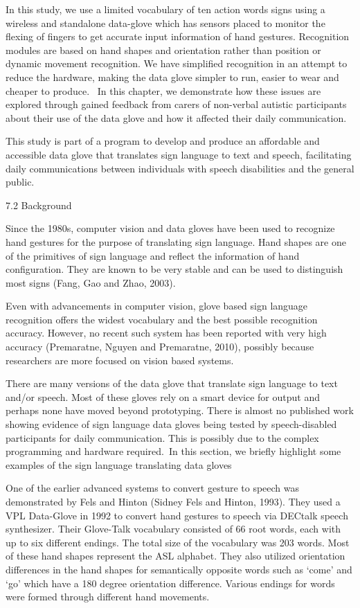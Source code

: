 In this study, we use a limited vocabulary of ten action words signs using a wireless and standalone data-glove which has sensors placed to monitor the flexing of fingers to get accurate input information of hand gestures. Recognition modules are based on hand shapes and orientation rather than position or dynamic movement recognition. We have simplified recognition in an attempt to reduce the hardware, making the data glove simpler to run, easier to wear and cheaper to produce. 
In this chapter, we demonstrate how these issues are explored through gained feedback from carers of non-verbal autistic participants about their use of the data glove and how it affected their daily communication. 

This study is part of a program to develop and produce an affordable and accessible data glove that translates sign language to text and speech, facilitating daily communications between individuals with speech disabilities and the general public. 



7.2 Background

Since the 1980s, computer vision and data gloves have been used to recognize hand gestures for the purpose of translating sign language. Hand shapes are one of the primitives of sign language and reflect the information of hand configuration. They are known to be very stable and can be used to distinguish most signs (Fang, Gao and Zhao, 2003). 

Even with advancements in computer vision, glove based sign language recognition offers the widest vocabulary and the best possible recognition accuracy. However, no recent such system has been reported with very high accuracy (Premaratne, Nguyen and Premaratne, 2010), possibly because researchers are more focused on vision based systems. 

There are many versions of the data glove that translate sign language to text and/or speech. Most of these gloves rely on a smart device for output and perhaps none have moved beyond prototyping. There is almost no published work showing evidence of sign language data gloves being tested by speech-disabled participants for daily communication. This is possibly due to the complex programming and hardware required. In this section, we briefly highlight some examples of the sign language translating data gloves

One of the earlier advanced systems to convert gesture to speech was demonstrated by Fels and Hinton (Sidney Fels and Hinton, 1993). They used a VPL Data-Glove in 1992 to convert hand gestures to speech via DECtalk speech synthesizer. Their Glove-Talk vocabulary consisted of 66 root words, each with up to six different endings. The total size of the vocabulary was 203 words. Most of these hand shapes represent the ASL alphabet. They also utilized orientation differences in the hand shapes for semantically opposite words such as ‘come’ and ‘go’ which have a 180 degree orientation difference. Various endings for words were formed through different hand movements. 

